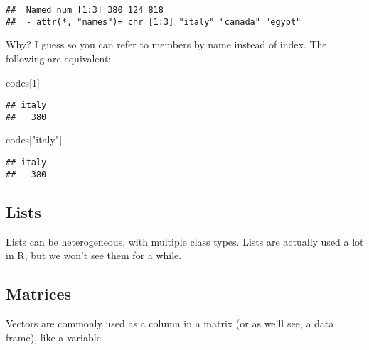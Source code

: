 \documentclass[
]{book}
\newenvironment{Shaded}{\begin{snugshade}}{\end{snugshade}}
\newcommand{\DecValTok}[1]{\textcolor[rgb]{0.00,0.00,0.81}{#1}}
\newcommand{\NormalTok}[1]{#1}
\newcommand{\StringTok}[1]{\textcolor[rgb]{0.31,0.60,0.02}{#1}}
\begin{document}
\begin{verbatim}
##  Named num [1:3] 380 124 818
##  - attr(*, "names")= chr [1:3] "italy" "canada" "egypt"
\end{verbatim}

Why? I guess so you can refer to members by name instead of index.
The following are equivalent:

\begin{Shaded}
\begin{Highlighting}[]
\NormalTok{codes[}\DecValTok{1}\NormalTok{]}
\end{Highlighting}
\end{Shaded}

\begin{verbatim}
## italy 
##   380
\end{verbatim}

\begin{Shaded}
\begin{Highlighting}[]
\NormalTok{codes[}\StringTok{"italy"}\NormalTok{]}
\end{Highlighting}
\end{Shaded}

\begin{verbatim}
## italy 
##   380
\end{verbatim}

\hypertarget{lists}{%
\subsection{Lists}\label{lists}}

Lists can be heterogeneous, with multiple class types. Lists are actually used a lot in R, but we won't see them for a while.

\hypertarget{matrices}{%
\subsection{Matrices}\label{matrices}}

Vectors are commonly used as a column in a matrix (or as we'll see, a data frame), like a variable
\end{document}
